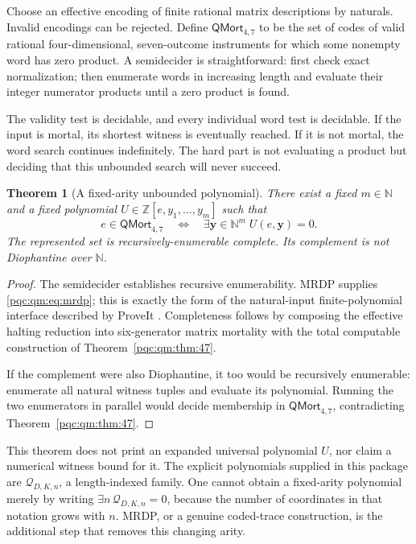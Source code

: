 \documentclass[11pt,letterpaper]{article}
\numberwithin{equation}{section}
\newtheorem{theorem}{Theorem}[section]
\theoremstyle{definition}
\theoremstyle{remark}
\newcommand{\N}{\mathbb N}
\newcommand{\Z}{\mathbb Z}
\newcommand{\QMort}{\mathsf{QMort}}
\begin{document}
Choose an effective encoding of finite rational matrix descriptions by naturals. Invalid encodings can be rejected. Define $\QMort_{4,7}$ to be the set of codes of valid rational four-dimensional, seven-outcome instruments for which some nonempty word has zero product. A semidecider is straightforward: first check exact normalization; then enumerate words in increasing length and evaluate their integer numerator products until a zero product is found.

The validity test is decidable, and every individual word test is decidable. If the input is mortal, its shortest witness is eventually reached. If it is not mortal, the word search continues indefinitely. The hard part is not evaluating a product but deciding that this unbounded search will never succeed.

\begin{theorem}[A fixed-arity unbounded polynomial]
\label{pqc:qm:thm:mrdp}
There exist a fixed $m\in\N$ and a fixed polynomial
$U\in\Z[e,y_1,\ldots,y_m]$ such that
\begin{equation}
 e\in\QMort_{4,7}
 \quad\Longleftrightarrow\quad
 \exists\mathbf y\in\N^m\; U(e,\mathbf y)=0.
 \label{pqc:qm:eq:mrdp}
\end{equation}
The represented set is recursively-enumerable complete. Its complement is not Diophantine over $\N$.
\end{theorem}
\begin{proof}
The semidecider establishes recursive enumerability. MRDP supplies \eqref{pqc:qm:eq:mrdp}; this is exactly the form of the natural-input finite-polynomial interface described by ProveIt \cite{proveit-mrdp-guide}. Completeness follows by composing the effective halting reduction into six-generator matrix mortality with the total computable construction of Theorem~\ref{pqc:qm:thm:47}.

If the complement were also Diophantine, it too would be recursively enumerable: enumerate all natural witness tuples and evaluate its polynomial. Running the two enumerators in parallel would decide membership in $\QMort_{4,7}$, contradicting Theorem~\ref{pqc:qm:thm:47}.
\end{proof}

This theorem does not print an expanded universal polynomial $U$, nor claim a numerical witness bound for it. The explicit polynomials supplied in this package are $\mathscr Q_{D,K,n}$, a length-indexed family. One cannot obtain a fixed-arity polynomial merely by writing $\exists n\,\mathscr Q_{D,K,n}=0$, because the number of coordinates in that notation grows with $n$. MRDP, or a genuine coded-trace construction, is the additional step that removes this changing arity.
\end{document}
